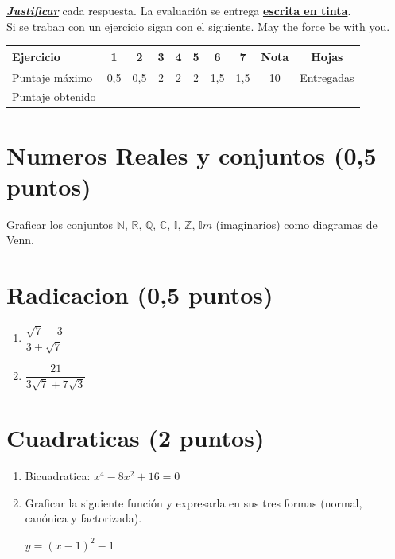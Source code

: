 \documentclass[a4paper,11pt,spanish,sans]{exam}
\begin{document}
\begin{center}
	\textsl{\textbf{\underline{Justificar}}} cada respuesta. La evaluación se entrega \textbf{\underline{escrita en tinta}}.\\
	Si se traban con un ejercicio sigan con el siguiente.
	May the force be with you.
\end{center}
\begin{table}[h]
	\centering
	\label{my-label}
	\begin{tabular}{|l|c|c|c|c|c|c|c|c|c|}
		\hline
		Ejercicio        & 1 & 2 & 3 & 4 & 5 & 6 & 7 & Nota & Hojas \\ \hline
		Puntaje máximo   & 0,5 & 0,5 & 2 & 2 & 2 & 1,5 & 1,5 & 10 &  Entregadas \\ \hline
		Puntaje obtenido &   &   & & & & & &  &   \\ \hline
	\end{tabular}
\end{table}


\section{Numeros Reales y conjuntos (0,5 puntos) }
Graficar los conjuntos $\mathbb{N}$, $\mathbb{R}$, $\mathbb{Q}$, $\mathbb{C}$, $\mathbb{I}$, $\mathbb{Z}$, $\mathbb{I}m$ (imaginarios) como diagramas de Venn.

\section{Radicacion (0,5 puntos)}

\begin{enumerate}
	\item $\dfrac{\sqrt{7}-3}{3+\sqrt{7}}$
	\item $\dfrac{21}{3\sqrt{7}+7\sqrt{3}}$
\end{enumerate}

\section{Cuadraticas (2 puntos)}
\begin{enumerate}
	\item Bicuadratica: $x^4-8x^2+16=0$
	\item Graficar la siguiente función y expresarla en sus tres formas (normal, canónica y factorizada).
	
	$y=(x-1)^2-1 $
\end{enumerate}
\end{document}

